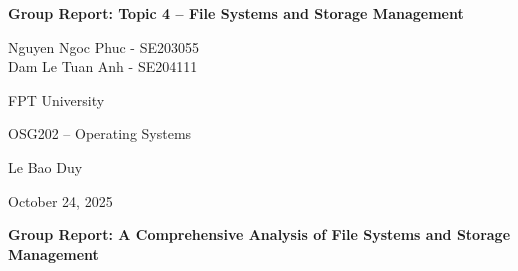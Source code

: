 \documentclass[12pt]{article}
\begin{document}
\begin{titlepage}
    \thispagestyle{fancy} %
    \centering
    
    \vspace*{3\baselineskip} %
    
    {\Large \bfseries Group Report: Topic 4 – File Systems and Storage Management\par}
    
    \vspace{2\baselineskip} %
    
    {\large
        Nguyen Ngoc Phuc - SE203055 \\
        Dam Le Tuan Anh - SE204111\\
    }
    
    \vspace{1.5cm}
    
    {\large FPT University\par} %
    
    \vspace{1.5cm}
    
    {\large OSG202 – Operating Systems\par}
    
    \vspace{1.5cm}
    
    {\large Le Bao Duy\par}
    
    \vspace{1.5cm}
    
    {\large October 24, 2025\par}
    
\end{titlepage}

\onehalfspacing 

\tableofcontents
\newpage


\begin{center}
    \large \bfseries Group Report: A Comprehensive Analysis of File Systems and Storage Management
\end{center}
\vspace{1\baselineskip} %
\end{document}

